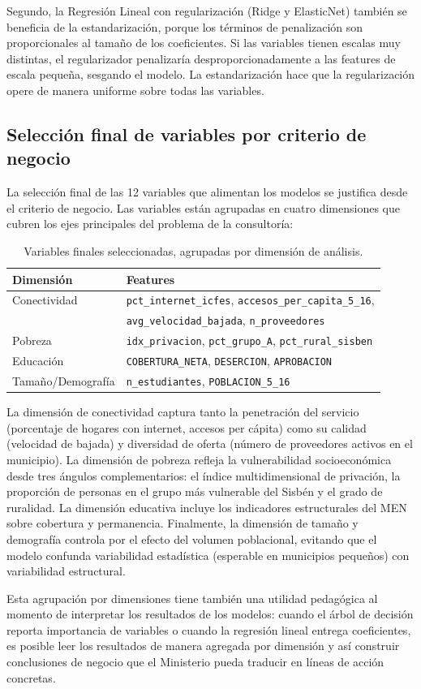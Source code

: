 Segundo, la Regresión Lineal con regularización (Ridge y ElasticNet) también se beneficia de la estandarización, porque los términos de penalización son proporcionales al tamaño de los coeficientes. Si las variables tienen escalas muy distintas, el regularizador penalizaría desproporcionadamente a las features de escala pequeña, sesgando el modelo. La estandarización hace que la regularización opere de manera uniforme sobre todas las variables.

\subsection{Selección final de variables por criterio de negocio}
La selección final de las 12 variables que alimentan los modelos se justifica desde el criterio de negocio. Las variables están agrupadas en cuatro dimensiones que cubren los ejes principales del problema de la consultoría:

\begin{table}[H]
\centering
\caption{Variables finales seleccionadas, agrupadas por dimensión de análisis.}
\begin{tabular}{l l}
\toprule
\textbf{Dimensión} & \textbf{Features} \\
\midrule
Conectividad & \texttt{pct\_internet\_icfes}, \texttt{accesos\_per\_capita\_5\_16}, \\
             & \texttt{avg\_velocidad\_bajada}, \texttt{n\_proveedores} \\
Pobreza      & \texttt{idx\_privacion}, \texttt{pct\_grupo\_A}, \texttt{pct\_rural\_sisben} \\
Educación    & \texttt{COBERTURA\_NETA}, \texttt{DESERCION}, \texttt{APROBACION} \\
Tamaño/Demografía & \texttt{n\_estudiantes}, \texttt{POBLACION\_5\_16} \\
\bottomrule
\end{tabular}
\end{table}

La dimensión de conectividad captura tanto la penetración del servicio (porcentaje de hogares con internet, accesos per cápita) como su calidad (velocidad de bajada) y diversidad de oferta (número de proveedores activos en el municipio). La dimensión de pobreza refleja la vulnerabilidad socioeconómica desde tres ángulos complementarios: el índice multidimensional de privación, la proporción de personas en el grupo más vulnerable del Sisbén y el grado de ruralidad. La dimensión educativa incluye los indicadores estructurales del MEN sobre cobertura y permanencia. Finalmente, la dimensión de tamaño y demografía controla por el efecto del volumen poblacional, evitando que el modelo confunda variabilidad estadística (esperable en municipios pequeños) con variabilidad estructural.

Esta agrupación por dimensiones tiene también una utilidad pedagógica al momento de interpretar los resultados de los modelos: cuando el árbol de decisión reporta importancia de variables o cuando la regresión lineal entrega coeficientes, es posible leer los resultados de manera agregada por dimensión y así construir conclusiones de negocio que el Ministerio pueda traducir en líneas de acción concretas.
